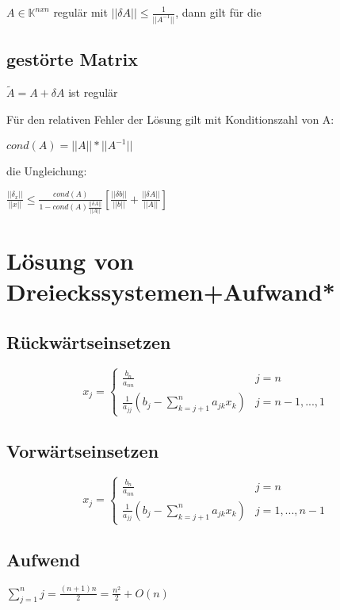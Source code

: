 \documentclass[12pt,a4paper]{article} %
\newcommand*\tab[1][1cm]{\hspace*{#1}}
\begin{document}
	$A \in \mathbb{K}^{n x n}$ regulär mit $||\delta A|| \le \frac{1}{||A^{-1}||}$, dann gilt für die
	
	\subsection{gestörte Matrix}
	
	$\tilde{A} = A + \delta A$ ist regulär
	
	Für den relativen Fehler der Lösung gilt mit Konditionszahl von A:
	
	\tab $cond(A) = ||A|| * ||A^{-1}||$
	
	die Ungleichung:
	
	\tab $\frac{||\delta_x||}{||x||} \le \frac{cond(A)}{1 - cond(A) \frac{||\delta A||}{||A||}}\left[ \frac{||\delta b||}{||b||} + \frac{||\delta A||}{||A||}\right] $
	
	\newpage
	
	\section{Lösung von Dreieckssystemen+Aufwand*}
	
	\subsection{Rückwärtseinsetzen}
	
	\[
		x_j=\left\{
			\begin{array}{ll}
				\frac{b_n}{a_{nn}} & j = n\\
				\frac{1}{a_{jj}}(b_j - \sum\limits_{k= j + 1}^na_{jk}x_k) & j = n - 1, ..., 1
			\end{array}
		\right.
	\]
	
	\subsection{Vorwärtseinsetzen}
	
	\[
		x_j=\left\{
			\begin{array}{ll}
				\frac{b_n}{a_{nn}} & j = n\\
				\frac{1}{a_{jj}}(b_j - \sum\limits_{k= j + 1}^na_{jk}x_k) & j = 1, ..., n - 1
			\end{array}
		\right.
	\]
	
	\subsection{Aufwend}
	
	$\sum\limits_{j = 1}^nj = \frac{(n + 1)n}{2} = \frac{n^2}{2} + O(n)$
	
\end{document}

